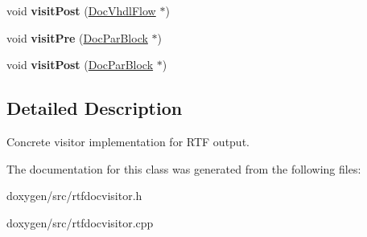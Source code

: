 \begin{DoxyCompactItemize}
\mbox{\label{class_r_t_f_doc_visitor_a600cf4c9635d8233f4a1cf887ecb5629}} 
void {\bfseries visit\+Post} (\mbox{\hyperlink{class_doc_vhdl_flow}{Doc\+Vhdl\+Flow}} $\ast$)
\item 
\mbox{\label{class_r_t_f_doc_visitor_abd7a9f28dd5ceb088a9f50e35634a1f5}} 
void {\bfseries visit\+Pre} (\mbox{\hyperlink{class_doc_par_block}{Doc\+Par\+Block}} $\ast$)
\item 
\mbox{\label{class_r_t_f_doc_visitor_a4b0499bd38e257ddf3c931ed5f35b903}} 
void {\bfseries visit\+Post} (\mbox{\hyperlink{class_doc_par_block}{Doc\+Par\+Block}} $\ast$)
\end{DoxyCompactItemize}


\subsection{Detailed Description}
Concrete visitor implementation for R\+TF output. 

The documentation for this class was generated from the following files\+:\begin{DoxyCompactItemize}
\item 
doxygen/src/rtfdocvisitor.\+h\item 
doxygen/src/rtfdocvisitor.\+cpp\end{DoxyCompactItemize}
